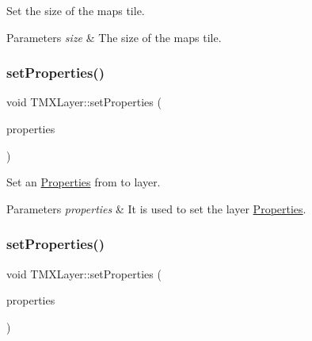 Set the size of the map\textquotesingle{}s tile.


\begin{DoxyParams}{Parameters}
{\em size} & The size of the map\textquotesingle{}s tile. \\
\hline
\end{DoxyParams}
\mbox{\label{classTMXLayer_ac7368336ee0929ac575119db824a6362}} 
\subsubsection{\texorpdfstring{set\+Properties()}{setProperties()}\hspace{0.1cm}{\footnotesize\ttfamily [1/2]}}
{\footnotesize\ttfamily void T\+M\+X\+Layer\+::set\+Properties (\begin{DoxyParamCaption}\item[{const Value\+Map \&}]{properties }\end{DoxyParamCaption})\hspace{0.3cm}{\ttfamily [inline]}}

Set an \hyperlink{classProperties}{Properties} from to layer.


\begin{DoxyParams}{Parameters}
{\em properties} & It is used to set the layer \hyperlink{classProperties}{Properties}. \\
\hline
\end{DoxyParams}
\mbox{\label{classTMXLayer_ac7368336ee0929ac575119db824a6362}} 
\subsubsection{\texorpdfstring{set\+Properties()}{setProperties()}\hspace{0.1cm}{\footnotesize\ttfamily [2/2]}}
{\footnotesize\ttfamily void T\+M\+X\+Layer\+::set\+Properties (\begin{DoxyParamCaption}\item[{const Value\+Map \&}]{properties }\end{DoxyParamCaption})\hspace{0.3cm}{\ttfamily [inline]}}

